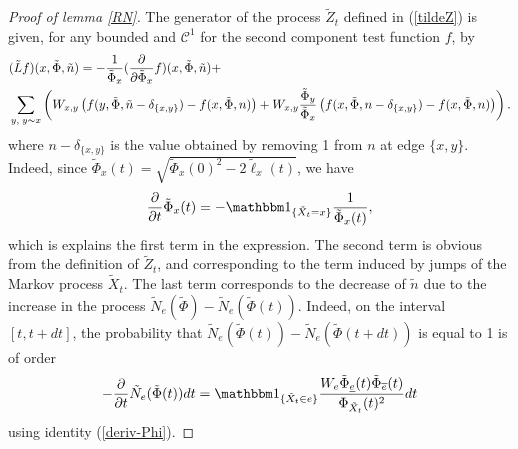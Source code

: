 \documentclass[11pt,a4paper]{amsart}
\numberwithin{equation}{section}
\def\indic{{{\mathbbm 1}}}
\begin{document}
\begin{proof}[Proof of lemma \ref{RN}]
The generator of the process $\tilde Z_t$ defined in (\ref{tildeZ}) is given, for any bounded and $\mathcal{C}^{1}$ for the second component test function $f$, by 
\begin{equation}
\label{tildeL2}
\begin{split}
&(\tilde L f)(x,\tilde\Phi,\tilde n)=
-{1\over \tilde \Phi_x} ({\partial\over \partial \tilde\Phi_x}f)
(x,\tilde\Phi, \tilde n) +\\
&
\sum_{y, \; y\sim x} \left(W_{x,y} \left(f(y,\tilde\Phi,\tilde n-\delta_{\{x,y\}})-f(x,\tilde\Phi,n)\right)+
W_{x,y} {\tilde \Phi_{y}\over \tilde \Phi_x} \left(f(x,\tilde\Phi, n-\delta_{\{x,y\}})-f(x,\tilde\Phi,n)\right)\right).
\end{split}
\end{equation}
where $ n-\delta_{\{x,y\}}$ is the value obtained by removing 1 from $n$ at edge $\{x,y\}$.
Indeed, since $\tilde \Phi_x(t)=
\sqrt{\tilde\Phi_{x}(0)^{2} -2\tilde \ell_x(t)}$, we have 
\begin{eqnarray}
\label{deriv-Phi}
{\partial\over\partial t} \tilde \Phi_x(t)=
-\indic_{\{\tilde X_t=x\}}{1\over \tilde \Phi_x(t)},
\end{eqnarray}
which is explains the first term in the expression. The second term is obvious from the definition of $\tilde Z_t$, and corresponding to the term induced by jumps
of the Markov process $\tilde X_t$. The last term corresponds to the decrease of $\tilde n$ due to the increase in the process
$\tilde N_e(\tilde \Phi)-\tilde N_e(\tilde \Phi(t))$. Indeed, on the interval $[t,t+dt]$, the probability that
$\tilde N_{e}(\tilde \Phi(t))-\tilde N_{e}(\tilde \Phi(t+dt))$
is equal to 1 is of order
$$-{\partial\over \partial t} \tilde N_e(\tilde \Phi(t))dt=\indic_{\{\tilde X_t\in e\}}
 {W_e \tilde \Phi_{\underline e}(t)\tilde\Phi_{\overline e}(t)\over \Phi_{\tilde X_t}(t)^2}dt
 $$
using identity (\ref{deriv-Phi}).


\end{proof}
\end{document}
